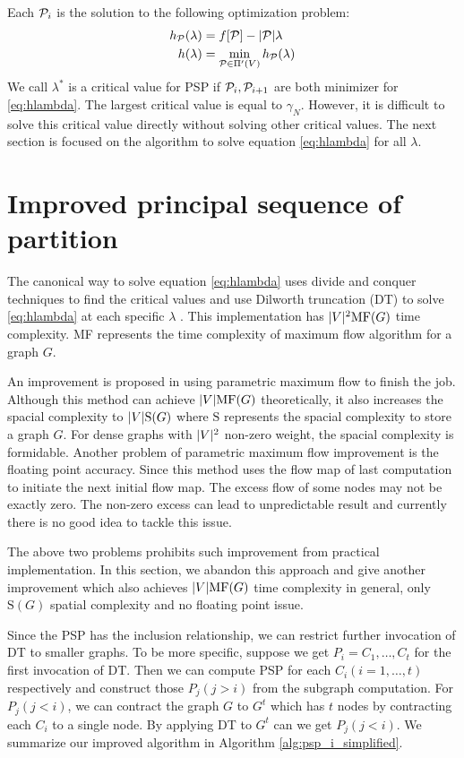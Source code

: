 \documentclass[runningheads]{llncs}
\begin{document}
Each $\P_i$ is the solution to the following optimization problem:
\begin{align}
h_{\P}(\lambda) &=  f[\P] - \abs{\P} \lambda  \label{eq:hPL}\\
h(\lambda) &= \min_{\P \in \Pi'(V)} h_{\P}(\lambda) \label{eq:hlambda}
\end{align}
We call $\lambda^*$ is a critical value for PSP if $\P_i, \P_{i+1}$ are both minimizer for \eqref{eq:hlambda}.
The largest critical value is equal to $\gamma_N$. However, it is difficult to solve this critical value directly without solving other critical values. The next section is focused on the algorithm to solve equation \eqref{eq:hlambda} for all $\lambda$.

\section{Improved principal sequence of partition}\label{sec:Alg}
The canonical way to solve equation \eqref{eq:hlambda} uses divide and conquer techniques to find the critical values and use Dilworth truncation (DT) to solve \eqref{eq:hlambda} at each specific $\lambda$ \cite{RN7}.  This implementation has $\abs{V}^2 \textrm{MF}(G)$ time complexity. \textrm{MF} represents the time complexity of maximum flow algorithm for a graph $G$. 

An improvement is proposed in \cite{RN4} using parametric maximum flow to finish the job. Although this method can achieve $\abs{V} \textrm{MF}(G)$ theoretically, it also increases the spacial complexity to $ \abs{V} \textrm{S}(G)$ where $\textrm{S}$ represents the spacial complexity to store a graph $G$. For dense graphs with $\abs{V}^2$ non-zero weight, the spacial complexity is formidable. 
Another problem of parametric maximum flow improvement is the floating point accuracy. Since this method uses the flow map of last computation to initiate the next initial flow map. The excess flow of some nodes may not be exactly zero. The non-zero excess can lead to unpredictable result and currently there is no good idea to tackle this issue. 

The above two problems prohibits such improvement from practical implementation. In this section, we abandon this approach and give another improvement which also achieves $\abs{V} \textrm{MF}(G)$ time complexity in general, only $\textrm{S}(G)$ spatial complexity and no floating point issue.

Since the PSP has the inclusion relationship, we can restrict further invocation of DT to smaller graphs. To be more specific, suppose we get $P_i = {C_1, \dots, C_t}$ for the first invocation of DT. Then we can compute PSP for each $C_i(i=1,\dots, t)$ respectively and construct those $P_j(j>i)$ from the subgraph computation. For $P_j(j<i)$, we can contract the graph $G$  to $G^t$ which has $t$ nodes by contracting each $C_i$ to a single node. By applying DT to $G^t$ can we get $P_j(j<i)$. We summarize our improved algorithm in Algorithm \ref{alg:psp_i_simplified}.
\end{document}
